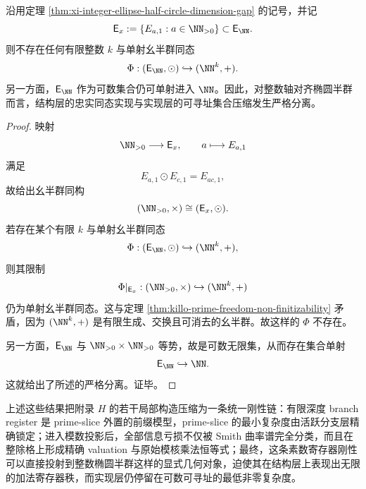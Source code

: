 \begin{corollary}[整数轴对齐椭圆半群不存在任何有限加法账本的忠实同态实现]\label{cor:xi-integer-ellipse-no-faithful-finite-additive-ledger}
沿用定理 \ref{thm:xi-integer-ellipse-half-circle-dimension-gap} 的记号，并记
\[
\mathsf E_x:=\{E_{a,1}:a\in\NN_{>0}\}\subset \mathsf E_{\NN}.
\]
则不存在任何有限整数 \(k\) 与单射幺半群同态
\[
\Phi:(\mathsf E_{\NN},\odot)\hookrightarrow (\NN^k,+).
\]
另一方面，\(\mathsf E_{\NN}\) 作为可数集合仍可单射进入 \(\NN\)。因此，对整数轴对齐椭圆半群而言，结构层的忠实同态实现与实现层的可寻址集合压缩发生严格分离。
\end{corollary}
\begin{proof}
映射
\[
\NN_{>0}\longrightarrow \mathsf E_x,\qquad
a\longmapsto E_{a,1}
\]
满足
\[
E_{a,1}\odot E_{c,1}=E_{ac,1},
\]
故给出幺半群同构
\[
(\NN_{>0},\times)\cong (\mathsf E_x,\odot).
\]
若存在某个有限 \(k\) 与单射幺半群同态
\[
\Phi:(\mathsf E_{\NN},\odot)\hookrightarrow (\NN^k,+),
\]
则其限制
\[
\Phi|_{\mathsf E_x}:(\NN_{>0},\times)\hookrightarrow (\NN^k,+)
\]
仍为单射幺半群同态。这与定理 \ref{thm:killo-prime-freedom-non-finitizability} 矛盾，因为 \((\NN^k,+)\) 是有限生成、交换且可消去的幺半群。故这样的 \(\Phi\) 不存在。

另一方面，\(\mathsf E_{\NN}\) 与 \(\NN_{>0}\times \NN_{>0}\) 等势，故是可数无限集，从而存在集合单射
\[
\mathsf E_{\NN}\hookrightarrow \NN.
\]
这就给出了所述的严格分离。证毕。
\end{proof}

\noindent
上述这些结果把附录 \(H\) 的若干局部构造压缩为一条统一刚性链：有限深度 branch register 是 prime-slice 外置的前缀模型，prime-slice 的最小复杂度由活跃分支层精确锁定；进入模数投影后，全部信息亏损不仅被 Smith 曲率谱完全分类，而且在整除格上形成精确 valuation 与原始模核乘法恒等式；最终，这条素数寄存器刚性可以直接投射到整数椭圆半群这样的显式几何对象，迫使其在结构层上表现出无限的加法寄存器秩，而实现层仍停留在可数可寻址的最低非零复杂度。

\endinput
